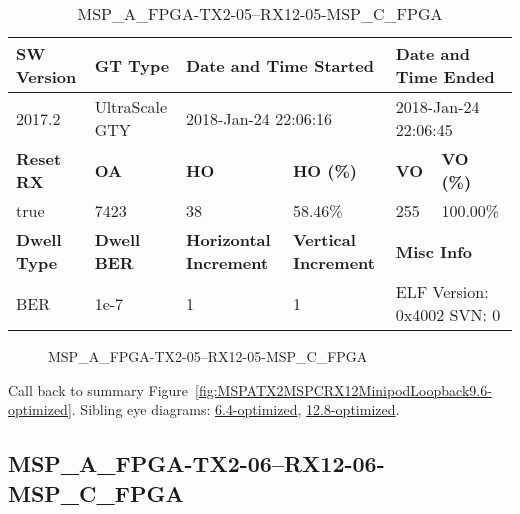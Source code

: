 \begin{table}[h]
\centering
\caption{MSP\_A\_FPGA-TX2-05--RX12-05-MSP\_C\_FPGA}
\label{tab:MSPAFPGATX205RX1205MSPCFPGA9.6-optimized}
\begin{tabular}{@{}|l|l|l|l|l|l|@{}}
\toprule
\textbf{SW Version}                & \textbf{GT Type}   & \multicolumn{2}{l|}{\textbf{Date and Time Started}}            & \multicolumn{2}{l|}{\textbf{Date and Time Ended}}        \\ \midrule
2017.2                       & UltraScale GTY          & \multicolumn{2}{l|}{2018-Jan-24 22:06:16}                   & \multicolumn{2}{l|}{2018-Jan-24 22:06:45}               \\ \midrule
\textbf{Reset RX}                  & \textbf{OA} & \textbf{HO}   & \textbf{HO (\%)} & \textbf{VO} & \textbf{VO (\%)} \\ \midrule
true & 7423        & 38          & 58.46\%        & 255        & 100.00\%       \\ \midrule
\textbf{Dwell Type}                & \textbf{Dwell BER} & \textbf{Horizontal Increment} & \textbf{Vertical Increment}    & \multicolumn{2}{l|}{\textbf{Misc Info}}                  \\ \midrule
BER                            & 1e-7        & 1        & 1           & \multicolumn{2}{l|}{ELF Version: 0x4002 SVN: 0}                         \\ \bottomrule
\end{tabular}
\end{table}

\begin{figure}[h]
\caption{MSP\_A\_FPGA-TX2-05--RX12-05-MSP\_C\_FPGA} \label{fig:MSPAFPGATX205RX1205MSPCFPGA9.6-optimized}
\end{figure}

Call back to summary Figure~\ref{fig:MSPATX2MSPCRX12MinipodLoopback9.6-optimized}.
Sibling eye diagrams: \hyperref[sec:MSPAFPGATX205RX1205MSPCFPGA6.4-optimized]{6.4-optimized}, \hyperref[sec:MSPAFPGATX205RX1205MSPCFPGA12.8-optimized]{12.8-optimized}.

\clearpage
\newpage


\subsection{MSP\_A\_FPGA-TX2-06--RX12-06-MSP\_C\_FPGA}\label{sec:MSPAFPGATX206RX1206MSPCFPGA9.6-optimized}

